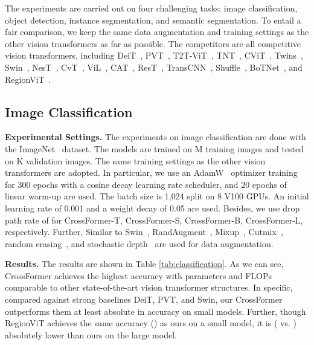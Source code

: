 \documentclass{article} \usepackage{iclr2022_conference,times}
\begin{document}
The experiments are carried out on four challenging tasks: image classification, object detection, instance segmentation, and semantic segmentation. To entail a fair comparison, we keep the same data augmentation and training settings as the other vision transformers as far as possible.
The competitors are all competitive vision transformers, including DeiT~\citep{DBLP:conf/icml/TouvronCDMSJ21}, PVT~\citep{DBLP:journals/corr/abs-2102-12122}, T2T-ViT~\citep{DBLP:journals/corr/abs-2101-11986}, TNT~\citep{DBLP:journals/corr/abs-2103-00112}, CViT~\citep{DBLP:journals/corr/abs-2103-14899}, Twins~\citep{DBLP:journals/corr/abs-2104-13840}, Swin~\citep{DBLP:journals/corr/abs-2103-14030}, NesT~\citep{DBLP:journals/corr/abs-2105-12723}, CvT~\citep{DBLP:journals/corr/abs-2103-15808},  ViL~\citep{DBLP:journals/corr/abs-2103-15358},
CAT~\citep{DBLP:journals/corr/abs-2106-05786}, ResT~\citep{DBLP:journals/corr/abs-2105-13677}, TransCNN~\citep{DBLP:journals/corr/abs-2106-03180}, Shuffle~\citep{DBLP:journals/corr/abs-2106-03650}, BoTNet~\citep{DBLP:journals/corr/abs-2101-11605}, and RegionViT~\citep{DBLP:journals/corr/abs-2106-02689}.

\vspace{-2mm}
\subsection{Image Classification}
\vspace{-1mm}
\textbf{Experimental Settings.} The experiments on image classification are done with the ImageNet~\citep{DBLP:journals/ijcv/RussakovskyDSKS15} dataset. The models are trained on M training images and tested on K validation images. The same training settings as the other vision transformers are adopted. In particular, we use an AdamW~\citep{DBLP:journals/corr/KingmaB14} optimizer training for 300 epochs with a cosine decay learning rate scheduler, and 20 epochs of linear warm-up are used. The batch size is 1,024 split on 8 V100 GPUs. An initial learning rate of 0.001 and a weight decay of 0.05 are used.
Besides, we use drop path rate of  for CrossFormer-T, CrossFormer-S, CrossFormer-B, CrossFormer-L, respectively. Further, Similar to Swin~\citep{DBLP:journals/corr/abs-2103-14030}, RandAugment~\citep{DBLP:conf/nips/CubukZS020}, Mixup~\citep{DBLP:conf/iclr/ZhangCDL18}, Cutmix~\citep{DBLP:conf/iccv/YunHCOYC19}, random erasing~\citep{DBLP:conf/aaai/Zhong0KL020}, and stochastic depth~\citep{DBLP:conf/eccv/HuangSLSW16} are used for data augmentation.

\textbf{Results.} The results are shown in Table \ref{tab:classification}. As we can see, CrossFormer achieves the highest accuracy with parameters and FLOPs comparable to other state-of-the-art vision transformer structures. In specific, compared against strong baselines DeiT, PVT, and Swin, our CrossFormer outperforms them at least absolute  in accuracy on small models.
Further, though RegionViT achieves the same accuracy () as ours on a small model, it is  ( vs. ) absolutely lower than ours on the large model.
\end{document}
